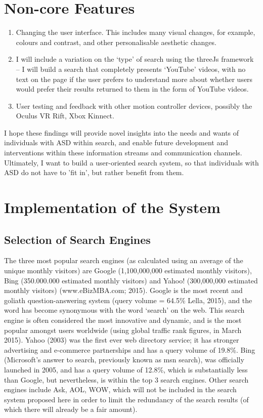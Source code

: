 \documentclass[10pt]{article}
\begin{document}
\section{Non-core Features}
\begin{enumerate}
\item Changing the user interface. This includes many visual changes, for example, colours and contrast, and other personalisable aesthetic changes.

\item	I will include a variation on the ‘type’ of search using the threeJs framework – I will build a search that completely presents ‘YouTube’ videos, with no text on the page if the user prefers to understand more about whether users would prefer their results returned to them in the form of YouTube videos.

\item	User testing and feedback with other motion controller devices, possibly the Oculus VR Rift, Xbox Kinnect.

\end{enumerate}
I hope these findings will provide novel insights into the needs and wants of individuals with ASD within search, and enable future development and interventions within these information streams and communication channels. Ultimately, I want to build a user-oriented search system, so that individuals with ASD do not have to 'fit in', but rather benefit from them.

\section{Implementation of the System}\label{implementation}
\subsection{Selection of Search Engines}
The three most popular search engines (as calculated using an average of the unique monthly visitors) are Google (1,100,000,000 estimated monthly visitors), Bing (350.000.000 estimated monthly visitors) and Yahoo! (300,000,000 estimated monthly visitors) (www.eBizMBA.com; 2015). Google is the most recent and goliath question-answering system (query volume = 64.5\% Lella, 2015), and the word has become synonymous with the word ‘search’ on the web. This search engine is often considered the most innovative and dynamic, and is the most popular amongst users worldwide (using global traffic rank figures, in March 2015). Yahoo (2003) was the first ever web directory service; it has stronger advertising and e-commerce partnerships and has a query volume of 19.8\%. Bing (Microsoft’s answer to search, previously known as msn search), was officially launched in 2005, and has a query volume of 12.8\%, which is substantially less than Google, but nevertheless, is within the top 3 search engines. Other search engines include Ask, AOL, WOW, which will not be included in the search system proposed here in order to limit the redundancy of the search results (of which there will already be a fair amount). 
\end{document}
